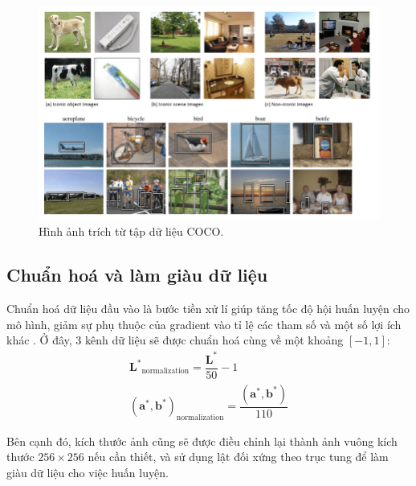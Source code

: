 \documentclass[a4paper, 12pt]{article}
\begin{document}
\begin{figure}[!h]
\captionsetup{width=0.8\textwidth}
\centering
\includegraphics[width=15cm]{images/3_1.png}
\caption{Hình ảnh trích từ tập dữ liệu COCO.}
\end{figure}

\subsection{Chuẩn hoá và làm giàu dữ liệu}\label{normalization}

Chuẩn hoá dữ liệu đầu vào là bước tiền xử lí giúp tăng tốc độ hội huấn luyện cho mô hình, giảm sự phụ thuộc của gradient vào tỉ lệ các tham số và một số lợi ích khác \cite{jasonscaledata2019, benscaledata2012}. Ở đây, 3 kênh dữ liệu sẽ được chuẩn hoá cùng về một khoảng $[-1, 1]$:
\begin{align*}
    \mathbf{L^*}_{\text{normalization}} = \dfrac{\mathbf{L^*}}{50} - 1\\
    \mathbf{(a^*, b^*)}_{\text{normalization}} = \dfrac{\mathbf{(a^*, b^*)}}{110}
\end{align*}

\noindent
Bên cạnh đó, kích thước ảnh cũng sẽ được điều chỉnh lại thành ảnh vuông kích thước $256\times 256$ nếu cần thiết, và sử dụng lật đối xứng theo trục tung để làm giàu dữ liệu cho việc huấn luyện.
\end{document}
